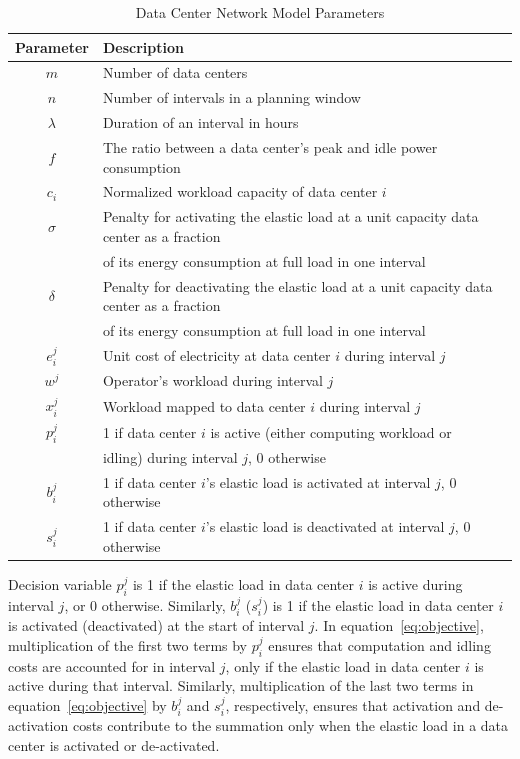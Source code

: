 \begin{table}
\begin{center}
\begin{tabular}{cl}
\hline Parameter & Description \\
\hline $m$ & Number of data centers \\
 $n$ & Number of intervals in a planning window \\
 $\lambda$ & Duration of an interval in hours \\
  $f$ & The ratio between a data center's peak and idle power consumption \\
 $c_i$ & Normalized workload capacity of data center $i$ \\
 $\sigma$ & Penalty for activating the elastic load at a unit capacity data center as a fraction\\
\ & of its energy consumption at full load in one interval \\
 $\delta$ & Penalty for deactivating the elastic load at a unit capacity data center as a fraction\\
\ & of its energy consumption at full load in one interval \\
 $e_i^j$ & Unit cost of electricity at data center $i$ during interval $j$ \\
 $w^j$ & Operator's workload during interval $j$ \\
 $x_i^j$ & Workload mapped to data center $i$ during interval $j$ \\
 $p_i^j$ & 1 if data center $i$ is active (either computing workload or\\
\ & idling) during interval $j$, $0$ otherwise \\
 $b_i^j$ & 1 if data center $i$'s elastic load is activated at interval $j$, $0$ otherwise \\
 $s_i^j$ & 1 if data center $i$'s elastic load is deactivated at interval $j$, $0$ otherwise \\
\hline
\end{tabular}
\caption{Data Center Network Model Parameters}
\label{tab:model}
\end{center}
\end{table}

Decision variable $p_i^j$ is 1 if the elastic load in data center $i$ is active during interval $j$, or 0 otherwise. Similarly, $b_i^j$ ($s_i^j$) is 1 if the elastic load in data center $i$ is activated (deactivated) at the start of interval $j$. In equation~\eqref{eq:objective}, multiplication of the first two terms by $p_i^j$ ensures that computation and idling costs are accounted for in interval $j$, only if the elastic load in data center $i$ is active during that interval. Similarly, multiplication of the last two terms in equation~\eqref{eq:objective} by $b_i^j$ and $s_i^j$, respectively, ensures that activation and de-activation costs contribute to the summation only when the elastic load in a data center is activated or de-activated.

